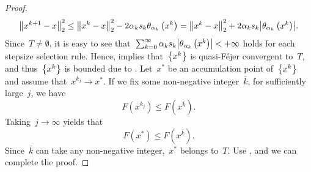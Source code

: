 \documentclass[../main]{subfiles}
\begin{document}
\begin{proof}
    \begin{equation}
        \norm*{x^{k + 1} - x}_2^2 \le \norm*{x^k - x}_2^2 - 2 \alpha_k s_k \theta_{\alpha_k}\left(x^k\right) = \norm*{x^k - x}_2^2 + 2 \alpha_k s_k \abs*{\theta_{\alpha_k}\left(x^k\right)}
    .\end{equation} 
    Since~$T \neq \emptyset$, it is easy to see that~$\sum_{k = 0}^{\infty} \alpha_k s_k \abs*{\theta_{\alpha_k}\left(x^k\right)} < + \infty$ holds for each stepsize selection rule.
    Hence,  implies that~$\set*{x^k}$ is quasi-F\'ejer convergent to~$T$, and thus~$\set*{x^k}$ is bounded due to .
    Let~$x^*$ be an accumulation point of~$\set*{x^k}$ and assume that~$x^{k_j} \to x^*$.
    If we fix some non-negative integer~$\bar{k}$, for sufficiently large~$j$, we have
    \begin{equation}
        F\left(x^{k_j}\right) \le F\left(x^{\bar{k}}\right)
    .\end{equation} 
    Taking~$j \to \infty$ yields that
    \begin{equation}
        F\left(x^*\right) \le F\left(x^{\bar{k}}\right)
    .\end{equation} 
    Since~$\bar{k}$ can take any non-negative integer,~$x^*$ belongs to~$T$.
    Use , and we can complete the proof.
\end{proof}
\end{document}
